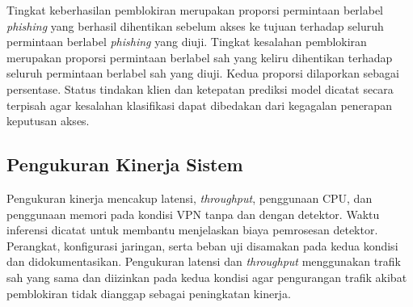 Tingkat keberhasilan pemblokiran merupakan proporsi permintaan berlabel \textit{phishing} yang berhasil dihentikan sebelum akses ke tujuan terhadap seluruh permintaan berlabel \textit{phishing} yang diuji. Tingkat kesalahan pemblokiran merupakan proporsi permintaan berlabel sah yang keliru dihentikan terhadap seluruh permintaan berlabel sah yang diuji. Kedua proporsi dilaporkan sebagai persentase. Status tindakan klien dan ketepatan prediksi model dicatat secara terpisah agar kesalahan klasifikasi dapat dibedakan dari kegagalan penerapan keputusan akses.

\subsection{Pengukuran Kinerja Sistem}

Pengukuran kinerja mencakup latensi, \textit{throughput}, penggunaan CPU, dan penggunaan memori pada kondisi VPN tanpa dan dengan detektor. Waktu inferensi dicatat untuk membantu menjelaskan biaya pemrosesan detektor. Perangkat, konfigurasi jaringan, serta beban uji disamakan pada kedua kondisi dan didokumentasikan. Pengukuran latensi dan \textit{throughput} menggunakan trafik sah yang sama dan diizinkan pada kedua kondisi agar pengurangan trafik akibat pemblokiran tidak dianggap sebagai peningkatan kinerja.
